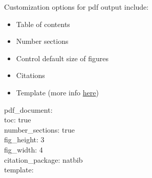 \documentclass[]{article}
\providecommand{\tightlist}{%
  \setlength{\itemsep}{0pt}\setlength{\parskip}{0pt}}
\begin{document}
Customization options for pdf output include:

\begin{itemize}
\tightlist
\item
  Table of contents
\item
  Number sections
\item
  Control default size of figures
\item
  Citations
\item
  Template (more info
  \href{http://jianghao.wang/post/2017-12-08-rmarkdown-templates/}{here})
\end{itemize}

pdf\_document:\\
toc: true\\
number\_sections: true\\
fig\_height: 3\\
fig\_width: 4\\
citation\_package: natbib\\
template:
\end{document}
